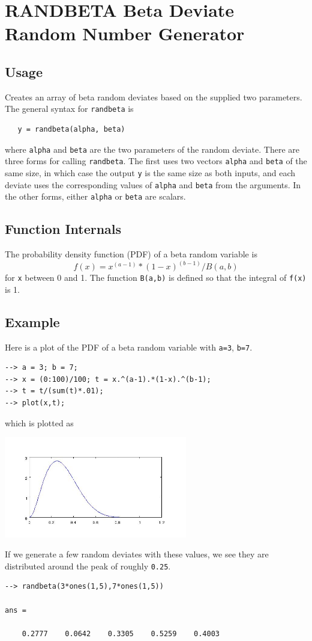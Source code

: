 \section{RANDBETA Beta Deviate Random Number Generator}

\subsection{Usage}

Creates an array of beta random deviates based on the supplied
two parameters. The general syntax for \verb|randbeta| is 
\begin{verbatim}
   y = randbeta(alpha, beta)
\end{verbatim}
where \verb|alpha| and \verb|beta| are the two parameters of the 
random deviate.  There are three forms for calling \verb|randbeta|.
The first uses two vectors \verb|alpha| and \verb|beta| of the same
size, in which case the output \verb|y| is the same size as both
inputs, and each deviate uses the corresponding values of \verb|alpha|
and \verb|beta| from the arguments.  In the other forms, either
\verb|alpha| or \verb|beta| are scalars.
\subsection{Function Internals}

The probability density function (PDF) of a beta random variable
is
\[
f(x) = x^(a-1) * (1-x)^(b-1) / B(a,b)
\]
for \verb|x| between 0 and 1.  The function \verb|B(a,b)| is defined so
that the integral of \verb|f(x)| is 1.
\subsection{Example}

Here is a plot of the PDF of a beta random variable with \verb|a=3|,
\verb|b=7|.
\begin{verbatim}
--> a = 3; b = 7;
--> x = (0:100)/100; t = x.^(a-1).*(1-x).^(b-1); 
--> t = t/(sum(t)*.01);
--> plot(x,t);
\end{verbatim}
which is plotted as


\centerline{\includegraphics[width=8cm]{betapdf}}

If we generate a few random deviates with these values,
we see they are distributed around the peak of roughly
\verb|0.25|.
\begin{verbatim}
--> randbeta(3*ones(1,5),7*ones(1,5))

ans = 

    0.2777    0.0642    0.3305    0.5259    0.4003 
\end{verbatim}
